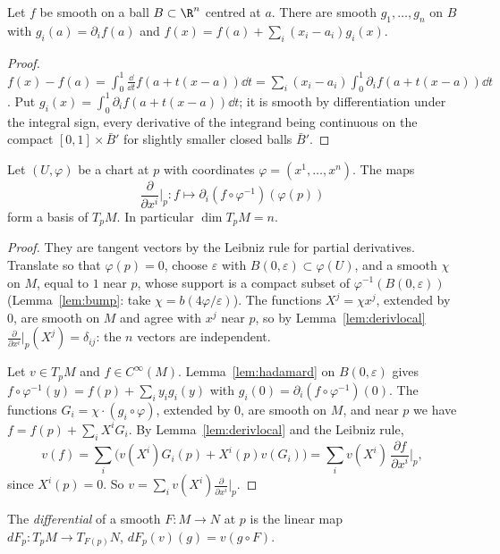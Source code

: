 \begin{lemma}[Hadamard]\label{lem:hadamard}
Let $f$ be smooth on a ball $B\subset\R^n$ centred at $a$. There are smooth $g_1,\dots,g_n$ on $B$ with $g_i(a)=\partial_if(a)$ and
$f(x)=f(a)+\sum_i(x_i-a_i)g_i(x)$.
\end{lemma}
\begin{proof}
$f(x)-f(a)=\int_0^1\frac{\dd}{\dd t}f(a+t(x-a))\dd t=\sum_i(x_i-a_i)\int_0^1\partial_if(a+t(x-a))\dd t$. Put $g_i(x)=\int_0^1\partial_if(a+t(x-a))\dd t$; it is smooth
by differentiation under the integral sign, every derivative of the integrand being continuous on the compact $[0,1]\times\bar B'$ for slightly smaller
closed balls $\bar B'$.
\end{proof}

\begin{theorem}\label{thm:tangentbasis}
Let $(U,\varphi)$ be a chart at $p$ with coordinates $\varphi=(x^1,\dots,x^n)$. The maps
\[
\frac{\partial}{\partial x^i}\Big|_p\colon f\mapsto\partial_i(f\circ\varphi^{-1})(\varphi(p))
\]
form a basis of $T_pM$. In particular $\dim T_pM=n$.
\end{theorem}
\begin{proof}
They are tangent vectors by the Leibniz rule for partial derivatives. Translate so that $\varphi(p)=0$, choose $\varepsilon$ with
$B(0,\varepsilon)\subset\varphi(U)$, and a smooth $\chi$ on $M$, equal to $1$ near $p$, whose support is a compact subset of $\varphi^{-1}(B(0,\varepsilon))$
(Lemma~\ref{lem:bump}: take $\chi=b(4\varphi/\varepsilon)$). The functions $X^j=\chi x^j$, extended by $0$, are smooth on $M$ and agree with $x^j$ near $p$, so by
Lemma~\ref{lem:derivlocal} $\frac{\partial}{\partial x^i}|_p(X^j)=\delta_{ij}$: the $n$ vectors are independent.

Let $v\in T_pM$ and $f\in C^\infty(M)$. Lemma~\ref{lem:hadamard} on $B(0,\varepsilon)$ gives $f\circ\varphi^{-1}(y)=f(p)+\sum_iy_ig_i(y)$ with
$g_i(0)=\partial_i(f\circ\varphi^{-1})(0)$. The functions $G_i=\chi\cdot(g_i\circ\varphi)$, extended by $0$, are smooth on $M$, and near $p$ we have
$f=f(p)+\sum_iX^iG_i$. By Lemma~\ref{lem:derivlocal} and the Leibniz rule,
\[
v(f)=\sum_i\bigl(v(X^i)G_i(p)+X^i(p)v(G_i)\bigr)=\sum_iv(X^i)\,\frac{\partial f}{\partial x^i}\Big|_p,
\]
since $X^i(p)=0$. So $v=\sum_iv(X^i)\frac{\partial}{\partial x^i}|_p$.
\end{proof}

\begin{definition}
The \emph{differential} of a smooth $F\colon M\to N$ at $p$ is the linear map $dF_p\colon T_pM\to T_{F(p)}N$, $dF_p(v)(g)=v(g\circ F)$.
\end{definition}

